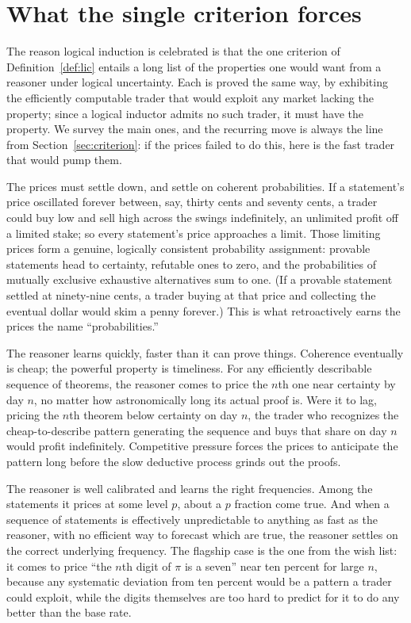 \documentclass[10pt]{article}
\theoremstyle{definition}
\theoremstyle{remark}
\begin{document}
\section{What the single criterion forces}
\label{sec:properties}

The reason logical induction is celebrated is that the one criterion of Definition~\ref{def:lic} entails a long list of the properties one would want from a reasoner under logical uncertainty. Each is proved the same way, by exhibiting the efficiently computable trader that would exploit any market lacking the property; since a logical inductor admits no such trader, it must have the property. We survey the main ones, and the recurring move is always the line from Section~\ref{sec:criterion}: if the prices failed to do this, here is the fast trader that would pump them.

The prices must settle down, and settle on coherent probabilities. If a statement's price oscillated forever between, say, thirty cents and seventy cents, a trader could buy low and sell high across the swings indefinitely, an unlimited profit off a limited stake; so every statement's price approaches a limit. Those limiting prices form a genuine, logically consistent probability assignment: provable statements head to certainty, refutable ones to zero, and the probabilities of mutually exclusive exhaustive alternatives sum to one. (If a provable statement settled at ninety-nine cents, a trader buying at that price and collecting the eventual dollar would skim a penny forever.) This is what retroactively earns the prices the name ``probabilities.''

The reasoner learns quickly, faster than it can prove things. Coherence eventually is cheap; the powerful property is timeliness. For any efficiently describable sequence of theorems, the reasoner comes to price the $n$th one near certainty by day $n$, no matter how astronomically long its actual proof is. Were it to lag, pricing the $n$th theorem below certainty on day $n$, the trader who recognizes the cheap-to-describe pattern generating the sequence and buys that share on day $n$ would profit indefinitely. Competitive pressure forces the prices to anticipate the pattern long before the slow deductive process grinds out the proofs.

The reasoner is well calibrated and learns the right frequencies. Among the statements it prices at some level $p$, about a $p$ fraction come true. And when a sequence of statements is effectively unpredictable to anything as fast as the reasoner, with no efficient way to forecast which are true, the reasoner settles on the correct underlying frequency. The flagship case is the one from the wish list: it comes to price ``the $n$th digit of $\pi$ is a seven'' near ten percent for large $n$, because any systematic deviation from ten percent would be a pattern a trader could exploit, while the digits themselves are too hard to predict for it to do any better than the base rate.
\end{document}
